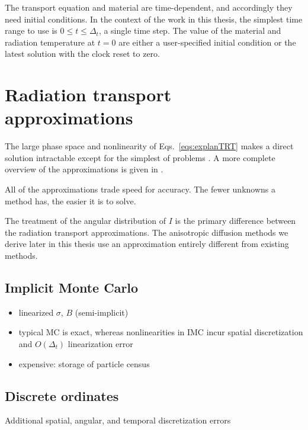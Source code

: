 The transport equation and material are time-dependent, and accordingly they
need initial conditions. In the context of the work in this thesis, the simplest
time range to use is $0 \le t \le \Delta_t$, a single time step. The value of
the material and radiation temperature at $t=0$ are either a user-specified
initial condition or the latest solution with the clock reset to zero.

\section{Radiation transport approximations}\label{sec:trtApproxMethods}

The large phase space and nonlinearity of Eqs.~\eqref{eqs:explanTRT} makes a
direct solution intractable except for the simplest of problems
\cite{Su1997,Mos2006}. A more complete overview of the approximations is given
in \cite{Bru2002,Ols2000,Wol2008}.

All of the approximations trade speed for accuracy. The fewer unknowns a method
has, the easier it is to solve.

The treatment of the angular distribution of $I$ is the
primary difference between the radiation transport approximations. The
anisotropic diffusion methods we derive later in this thesis use an
approximation entirely different from existing methods.

\subsection{Implicit Monte Carlo}

\begin{itemize}
  \item linearized $\sigma$, $B$ (semi-implicit)
  \item typical MC is exact, whereas nonlinearities in IMC incur spatial
    discretization and $O(\Delta_t)$ linearization error
  \item expensive: storage of particle census
\end{itemize}

\subsection{Discrete ordinates}

Additional spatial, angular, and temporal discretization errors

